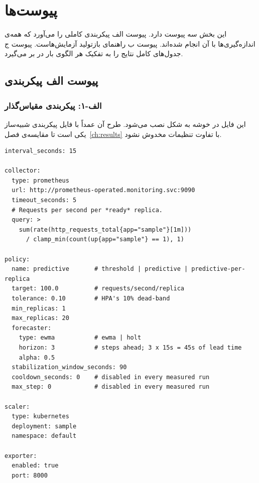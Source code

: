 \chapter*{پیوست‌ها}

این بخش سه پیوست دارد. پیوست الف پیکربندی کاملی را می‌آورد که همه‌ی اندازه‌گیری‌ها با آن
انجام شده‌اند. پیوست ب راهنمای بازتولید آزمایش‌هاست. پیوست ج جدول‌های کامل نتایج را به تفکیک
هر الگوی بار در بر می‌گیرد.

\section*{پیوست الف \mdash{} پیکربندی}

\subsection*{الف-۱: پیکربندی مقیاس‌گذار}

این فایل در خوشه به شکل  نصب می‌شود. طرح آن عمداً با فایل پیکربندی شبیه‌ساز
یکی است تا مقایسه‌ی فصل~\ref{ch:results} با تفاوت تنظیمات مخدوش نشود.

\begin{latin}
\begin{lstlisting}[language=yamlx]
interval_seconds: 15

collector:
  type: prometheus
  url: http://prometheus-operated.monitoring.svc:9090
  timeout_seconds: 5
  # Requests per second per *ready* replica.
  query: >
    sum(rate(http_requests_total{app="sample"}[1m]))
      / clamp_min(count(up{app="sample"} == 1), 1)

policy:
  name: predictive       # threshold | predictive | predictive-per-replica
  target: 100.0          # requests/second/replica
  tolerance: 0.10        # HPA's 10% dead-band
  min_replicas: 1
  max_replicas: 20
  forecaster:
    type: ewma           # ewma | holt
    horizon: 3           # steps ahead; 3 x 15s = 45s of lead time
    alpha: 0.5
  stabilization_window_seconds: 90
  cooldown_seconds: 0    # disabled in every measured run
  max_step: 0            # disabled in every measured run

scaler:
  type: kubernetes
  deployment: sample
  namespace: default

exporter:
  enabled: true
  port: 8000
\end{lstlisting}
\end{latin}

